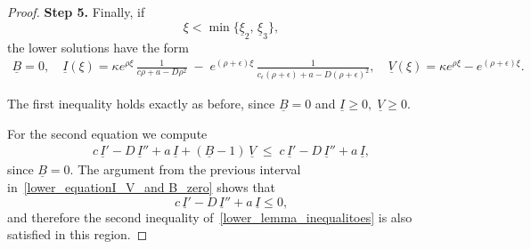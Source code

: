 \documentclass[11pt]{article}
\theoremstyle{definition}
\begin{document}
\begin{proof}
{}

\textbf{Step 5.} Finally, if 
\[
\xi < \min\{\underline{\xi}_{2},\,\underline{\xi}_{3}\},
\]
the lower solutions have the form
\begin{align}
  \underline{B}=0,  \quad\underline{I}(\xi)
    = \kappa e^{\rho \xi}\,
      \frac{1}{c\rho + a - D\rho^{2}}
      \;-\;
      e^{(\rho+\epsilon)\xi}\,
      \frac{1}{c_{\epsilon}(\rho+\epsilon)+a-D(\rho+\epsilon)^{2}},
    \quad 
  \underline{V}(\xi) = \kappa e^{\rho \xi} - e^{(\rho+\epsilon)\xi}.
\end{align}

The first inequality holds exactly as before, since $\underline{B}=0$ and 
\(
\underline{I} \ge 0,\; \underline{V} \ge 0.
\)

For the second equation we compute
\begin{align}
    c\,\underline{I}' - D\,\underline{I}'' + a\,\underline{I}
    + (\underline{B}-1)\,\underline{V}
    \;\le\;
    c\,\underline{I}' - D\,\underline{I}'' + a\,\underline{I},
\end{align}
since $\underline{B}=0$.  
The argument from the previous interval in~\eqref{lower_equationI_V_and B_zero} shows that
\[
c\,\underline{I}' - D\,\underline{I}'' + a\,\underline{I} \le 0,
\]
and therefore the second inequality of~\eqref{lower_lemma_inequalitoes} is also satisfied in this region.



\end{proof}
\end{document}
